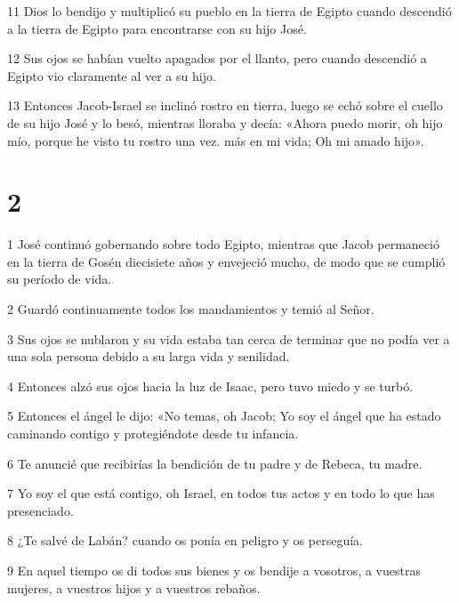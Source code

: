 \par 11 Dios lo bendijo y multiplicó su pueblo en la tierra de Egipto cuando descendió a la tierra de Egipto para encontrarse con su hijo José.

\par 12 Sus ojos se habían vuelto apagados por el llanto, pero cuando descendió a Egipto vio claramente al ver a su hijo.

\par 13 Entonces Jacob-Israel se inclinó rostro en tierra, luego se echó sobre el cuello de su hijo José y lo besó, mientras lloraba y decía: «Ahora puedo morir, oh hijo mío, porque he visto tu rostro una vez. más en mi vida; Oh mi amado hijo».


\chapter{2}


\par 1 José continuó gobernando sobre todo Egipto, mientras que Jacob permaneció en la tierra de Gosén diecisiete años y envejeció mucho, de modo que se cumplió su período de vida.

\par 2 Guardó continuamente todos los mandamientos y temió al Señor.

\par 3 Sus ojos se nublaron y su vida estaba tan cerca de terminar que no podía ver a una sola persona debido a su larga vida y senilidad.

\par 4 Entonces alzó sus ojos hacia la luz de Isaac, pero tuvo miedo y se turbó.

\par 5 Entonces el ángel le dijo: «No temas, oh Jacob; Yo soy el ángel que ha estado caminando contigo y protegiéndote desde tu infancia.

\par 6 Te anuncié que recibirías la bendición de tu padre y de Rebeca, tu madre.

\par 7 Yo soy el que está contigo, oh Israel, en todos tus actos y en todo lo que has presenciado.

\par 8 ¿Te salvé de Labán? cuando os ponía en peligro y os perseguía.

\par 9 En aquel tiempo os di todos sus bienes y os bendije a vosotros, a vuestras mujeres, a vuestros hijos y a vuestros rebaños.

